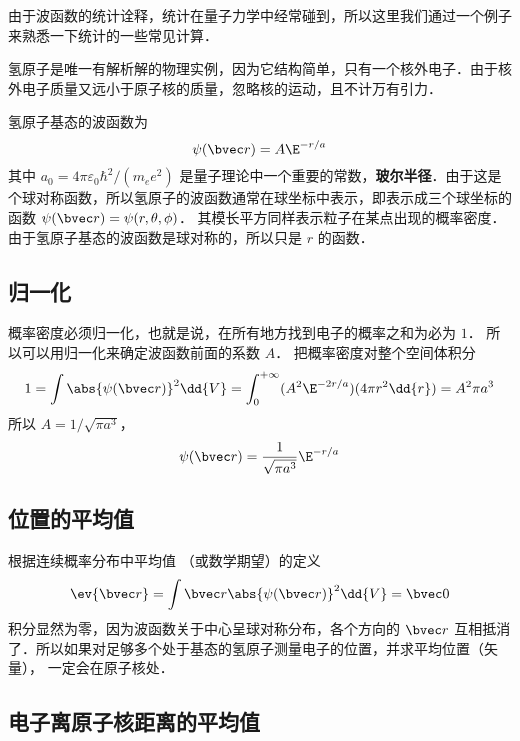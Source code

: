 

由于波函数的统计诠释，统计在量子力学中经常碰到，所以这里我们通过一个例子来熟悉一下统计的一些常见计算．

氢原子是唯一有解析解的物理实例，因为它结构简单，只有一个核外电子．由于核外电子质量又远小于原子核的质量，忽略核的运动，且不计万有引力．

氢原子基态的波函数为
\begin{equation}
\psi(\bvec r) = A\E^{-r/a}
\end{equation}
其中 $a_0 = 4\pi\varepsilon_0 \hbar ^2/(m_e e^2)$ 是量子理论中一个重要的常数，\textbf{玻尔半径}．由于这是个球对称函数，所以氢原子的波函数通常在球坐标中表示，即表示成三个球坐标的函数 $\psi (\bvec r) = \psi (r, \theta, \phi)$． 其模长平方同样表示粒子在某点出现的概率密度．由于氢原子基态的波函数是球对称的，所以只是 $r$ 的函数．

\subsection{归一化}
  
概率密度必须归一化，也就是说，在所有地方找到电子的概率之和为必为 $1$． 所以可以用归一化来确定波函数前面的系数 $A$． 把概率密度对整个空间体积分
\begin{equation}
1 = \int \abs{\psi(\bvec r)} ^2 \dd{V}  = \int_0^{+\infty} (A^2 \E^{-2r/a})(4\pi r^2\dd{r})  = A^2 \pi a^3
\end{equation}
所以 $A = 1/\sqrt{\pi a^3}$， 
\begin{equation}
\psi (\bvec r) = \frac{1}{\sqrt{\pi a^3}} \E^{-r/a}
\end{equation}

\subsection{位置的平均值}

 根据连续概率分布中平均值%
（或数学期望）的定义
\begin{equation}
\ev{\bvec r} = \int \bvec r \abs{\psi (\bvec r)} ^2 \dd{V} =  \bvec 0
\end{equation}
积分显然为零，因为波函数关于中心呈球对称分布，各个方向的 $\bvec r$ 互相抵消了．所以如果对足够多个处于基态的氢原子测量电子的位置，并求平均位置（矢量）， 一定会在原子核处．

\subsection{电子离原子核距离的平均值}


